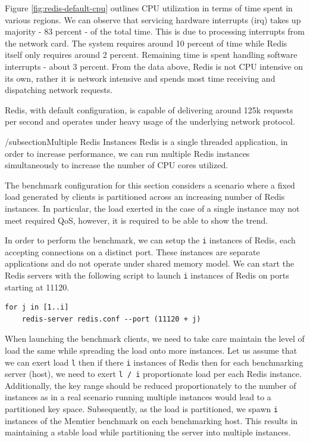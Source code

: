 Figure \ref{fig:redis-default-cpu} outlines CPU utilization in terms of time spent in various regions. We can observe that servicing hardware interrupts (irq) takes up majority - 83 percent - of the total time. This is due to processing interrupts from the network card. The system requires around 10 percent of time while Redis itself only requires around 2 percent. Remaining time is spent handling software interrupts - about 3 percent. From the data above, Redis is not CPU intensive on its own, rather it is network intensive and spends most time receiving and dispatching network requests.


Redis, with default configuration, is capable of delivering around 125k requests per second and operates under heavy usage of the underlying network protocol.


/subsection{Multiple Redis Instances}
Redis is a single threaded application, in order to increase performance, we can run multiple Redis instances simultaneously to increase the number of CPU cores utilized.

The benchmark configuration for this section considers a scenario where a fixed load generated by clients is partitioned across an increasing number of Redis instances. In particular, the load exerted in the case of a single instance may not meet required QoS, however, it is required to be able to show the trend.

In order to perform the benchmark, we can setup the \texttt{i} instances of Redis, each accepting connections on a distinct port. These instances are separate applications and do not operate under shared memory model. We can start the Redis servers with the following script to launch \texttt{i} instances of Redis on ports starting at 11120.

\begin{lstlisting}
for j in [1..i]
    redis-server redis.conf --port (11120 + j)
\end{lstlisting}

When launching the benchmark clients, we need to take care maintain the level of load the same while spreading the load onto more instances. Let us assume that we can exert load \texttt{l} then if there \texttt{i} instances of Redis then for each benchmarking server (host), we need to exert \texttt{l / i} proportionate load per each Redis instance. Additionally, the key range should be reduced proportionately to the number of instances as in a real scenario running multiple instances would lead to a partitioned key space. Subsequently, as the load is partitioned, we spawn \texttt{i} instances of the Memtier benchmark on each benchmarking host. This results in maintaining a stable load while partitioning the server into multiple instances.


